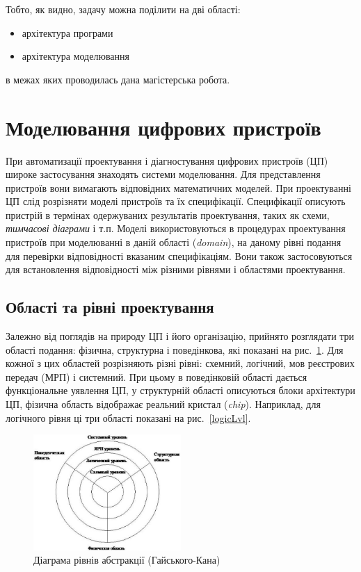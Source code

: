 \documentclass[12pt,a4paper]{article}
\begin{document}
Тобто, як видно, задачу можна поділити на дві області:
\begin{itemize}
  \item архітектура програми
  \item архітектура моделювання
\end{itemize}
в межах яких проводилась дана магістерська робота.

\clearpage

\section{Моделювання цифрових пристроїв}

При автоматизації проектування і діагностування цифрових пристроїв (ЦП) широке застосування знаходять системи моделювання. Для представлення пристроїв вони вимагають відповідних математичних моделей. При проектуванні ЦП слід розрізняти моделі пристроїв та їх специфікації. Специфікації описують пристрій в термінах одержуваних результатів проектування, таких як схеми, \emph{тимчасові діаграми} і т.п. Моделі використовуються в процедурах проектування пристроїв при моделюванні в даній області (\emph{domain}), на даному рівні подання для перевірки відповідності вказаним специфікаціям. Вони також застосовуються для встановлення відповідності між різними рівнями і областями проектування.

\subsection{Області та рівні проектування}

Залежно від поглядів на природу ЦП і його організацію, прийнято розглядати три області подання: фізична, структурна і поведінкова, які показані на рис.~\ref{abstrLvlDiag}. Для кожної з цих областей розрізняють різні рівні: схемний, логічний, мов реєстрових передач (МРП) і системний. При цьому в поведінковій області дається функціональне уявлення ЦП, у структурній області описуються блоки архітектури ЦП, фізична область відображає реальний кристал (\emph{chip}). Наприклад, для логічного рівня ці три області показані на рис.~\ref{logicLvl}.

\begin{figure}[h]
  \centering
    \includegraphics[width=0.5\textwidth]{01_01.jpg}
  \caption{Діаграма рівнів абстракції (Гайського-Кана)\label{abstrLvlDiag}}
\end{figure}
\end{document}
